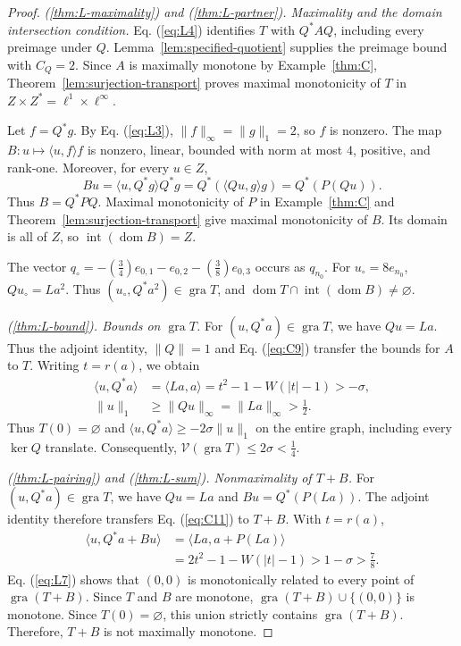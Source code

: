 \documentclass[11pt]{article}
\newcommand{\gra}{\operatorname{gra}}
\newcommand{\dom}{\operatorname{dom}}
\newcommand{\pair}[2]{\langle #1,#2\rangle}
\theoremstyle{definition}
\theoremstyle{remark}
\begin{document}
\begin{proof}
\noindent\textit{\textup{(\ref{thm:L-maximality})} and \textup{(\ref{thm:L-partner})}. Maximality and the domain intersection condition.}
Eq. (\ref{eq:L4}) identifies $T$ with $Q^*AQ$, including every preimage under $Q$. Lemma~\ref{lem:specified-quotient} supplies the preimage bound with $C_Q=2$. Since $A$ is maximally monotone by Example~\ref{thm:C}, Theorem~\ref{lem:surjection-transport} proves maximal monotonicity of $T$ in $Z\times Z^*=\ell^1\times\ell^\infty$.

\label{sec:L4}
Let $f=Q^*g$. By Eq. (\ref{eq:L3}), $\|f\|_\infty=\|g\|_1=2$, so $f$ is nonzero. The map $B:u\mapsto\pair{u}{f}f$ is nonzero, linear, bounded with norm at most $4$, positive, and rank-one. Moreover, for every $u\in Z$,
\[
Bu=\pair{u}{Q^*g}Q^*g
   =Q^*(\pair{Qu}{g}g)
   =Q^*(P(Qu)).
\]
Thus $B=Q^*PQ$. Maximal monotonicity of $P$ in Example~\ref{thm:C} and Theorem~\ref{lem:surjection-transport} give maximal monotonicity of $B$. Its domain is all of $Z$, so $\operatorname{int}(\dom B)=Z$.

The vector $q_\circ=-(\frac{3}{4})e_{0,1}-e_{0,2}-(\frac{3}{8})e_{0,3}$ occurs as $q_{n_0}$. For $u_\circ=8e_{n_0}$, $Qu_\circ=La^2$. Thus $(u_\circ,Q^*a^2)\in\gra T$, and $\dom T\cap\operatorname{int}(\dom B)\ne\varnothing$.

\noindent\textit{\textup{(\ref{thm:L-bound})}. Bounds on $\gra T$.}
\label{sec:L3}
For $(u,Q^*a)\in\gra T$, we have $Qu=La$. Thus the adjoint identity, $\|Q\|=1$ and Eq. (\ref{eq:C9}) transfer the bounds for $A$ to $T$. Writing $t=r(a)$, we obtain
\begin{equation}
\begin{aligned}
\pair{u}{Q^*a}&=\pair{La}{a}
 =t^2-1-W(|t|-1)>-\sigma,\\
\|u\|_1&\ge\|Qu\|_\infty=\|La\|_\infty>\frac{1}{2}.
\end{aligned}
\label{eq:L6}
\end{equation}
Thus $T(0)=\varnothing$ and $\pair{u}{Q^*a}\ge-2\sigma\|u\|_1$ on the entire graph, including every $\ker Q$ translate. Consequently, $\mathcal V(\gra T)\le2\sigma<\frac{1}{4}$.

\noindent\textit{\textup{(\ref{thm:L-pairing})} and \textup{(\ref{thm:L-sum})}. Nonmaximality of $T+B$.}
\label{sec:L5}
For $(u,Q^*a)\in\gra T$, we have $Qu=La$ and $Bu=Q^*(P(La))$. The adjoint identity therefore transfers Eq. (\ref{eq:C11}) to $T+B$. With $t=r(a)$,
\begin{equation}
\begin{aligned}
\pair{u}{Q^*a+Bu}
 &=\pair{La}{a+P(La)}\\
 &=2t^2-1-W(|t|-1)>1-\sigma>\frac{7}{8}.
\end{aligned}
\label{eq:L7}
\end{equation}
Eq. (\ref{eq:L7}) shows that $(0,0)$ is monotonically related to every point of $\gra(T+B)$. Since $T$ and $B$ are monotone, $\gra(T+B)\cup\{(0,0)\}$ is monotone. Since $T(0)=\varnothing$, this union strictly contains $\gra(T+B)$. Therefore, $T+B$ is not maximally monotone.
\end{proof}
\end{document}
